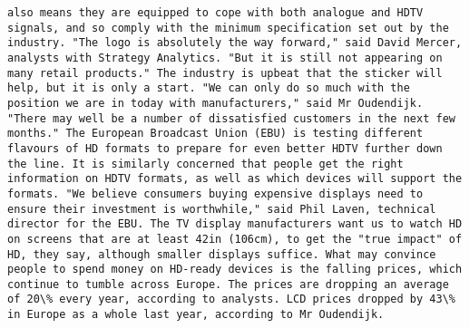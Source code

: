 \documentclass[11pt]{article}
\begin{document}
\begin{Verbatim}[commandchars=\\\{\}]
also means they are equipped to cope with both analogue and HDTV signals, and so comply with the minimum specification set out by the industry. "The logo is absolutely the way forward," said David Mercer, analysts with Strategy Analytics. "But it is still not appearing on many retail products." The industry is upbeat that the sticker will help, but it is only a start. "We can only do so much with the position we are in today with manufacturers," said Mr Oudendijk. "There may well be a number of dissatisfied customers in the next few months." The European Broadcast Union (EBU) is testing different flavours of HD formats to prepare for even better HDTV further down the line. It is similarly concerned that people get the right information on HDTV formats, as well as which devices will support the formats. "We believe consumers buying expensive displays need to ensure their investment is worthwhile," said Phil Laven, technical director for the EBU. The TV display manufacturers want us to watch HD on screens that are at least 42in (106cm), to get the "true impact" of HD, they say, although smaller displays suffice. What may convince people to spend money on HD-ready devices is the falling prices, which continue to tumble across Europe. The prices are dropping an average of 20\% every year, according to analysts. LCD prices dropped by 43\% in Europe as a whole last year, according to Mr Oudendijk.                                                                                                                                                                                                                                                                                                                                                                                                                        

\end{Verbatim}
\end{document}
